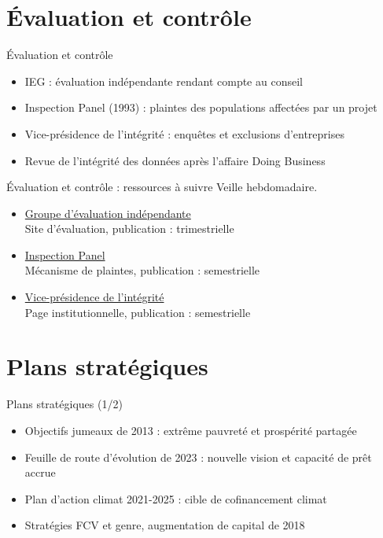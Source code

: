 \documentclass[aspectratio=169,11pt]{beamer}
\begin{document}
\section{Évaluation et contrôle}
\begin{frame}{Évaluation et contrôle}
\begin{itemize}
\item IEG : évaluation indépendante rendant compte au conseil
\item Inspection Panel (1993) : plaintes des populations affectées par un projet
\item Vice-présidence de l'intégrité : enquêtes et exclusions d'entreprises
\item Revue de l'intégrité des données après l'affaire Doing Business
\end{itemize}
\end{frame}

\begin{frame}{Évaluation et contrôle : ressources à suivre}
\small
Veille hebdomadaire.
\begin{itemize}
\item \href{https://ieg.worldbankgroup.org}{Groupe d'évaluation indépendante}\\{\footnotesize Site d'évaluation, publication : trimestrielle}
\item \href{https://www.inspectionpanel.org}{Inspection Panel}\\{\footnotesize Mécanisme de plaintes, publication : semestrielle}
\item \href{https://www.worldbank.org/en/about/unit/integrity-vice-presidency}{Vice-présidence de l'intégrité}\\{\footnotesize Page institutionnelle, publication : semestrielle}
\end{itemize}
\end{frame}

\section{Plans stratégiques}
\begin{frame}{Plans stratégiques (1/2)}
\begin{itemize}
\item Objectifs jumeaux de 2013 : extrême pauvreté et prospérité partagée
\item Feuille de route d'évolution de 2023 : nouvelle vision et capacité de prêt accrue
\item Plan d'action climat 2021-2025 : cible de cofinancement climat
\item Stratégies FCV et genre, augmentation de capital de 2018
\end{itemize}
\end{frame}
\end{document}
